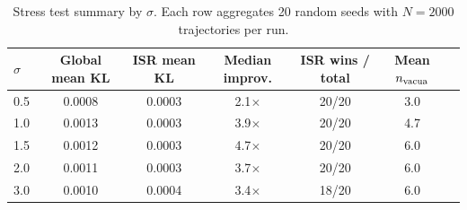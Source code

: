 \begin{table}[t]
  \centering
  \caption{Stress test summary by $\sigma$. Each row aggregates 20 random seeds with $N=2000$ trajectories per run.}
  \label{tab:stress_summary}
  \begin{tabular}{lcccccc}
    \toprule
    $\sigma$ & Global mean KL & ISR mean KL & Median improv. & ISR wins / total & Mean $n_{\rm vacua}$ \\
    \midrule
    0.5 & 0.0008 & 0.0003 & 2.1$\times$ & 20/20 & 3.0 \\
    1.0 & 0.0013 & 0.0003 & 3.9$\times$ & 20/20 & 4.7 \\
    1.5 & 0.0012 & 0.0003 & 4.7$\times$ & 20/20 & 6.0 \\
    2.0 & 0.0011 & 0.0003 & 3.7$\times$ & 20/20 & 6.0 \\
    3.0 & 0.0010 & 0.0004 & 3.4$\times$ & 18/20 & 6.0 \\
    \bottomrule
  \end{tabular}
\end{table}
